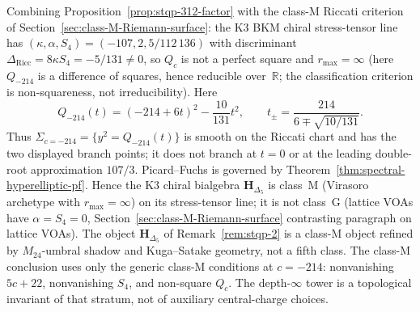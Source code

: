 \begin{remark}[Class-$\mathrm M$ placement of K3 via $c = -214$]
\label{rem:stqp-class-m}
Combining Proposition~\ref{prop:stqp-312-factor} with the
class-$\mathrm M$ Riccati criterion of
Section~\ref{sec:class-M-Riemann-surface}: the K3 BKM chiral
stress-tensor line has
$(\kappa, \alpha, S_4) = (-107, 2, 5/112\,136)$ with discriminant
$\Delta_{\mathrm{Ricc}} = 8\kappa S_4 = -5/131 \neq 0$, so $Q_c$
is not a perfect square and $r_{\max} = \infty$ (here $Q_{-214}$
is a difference of squares, hence reducible over~$\mathbb R$; the
classification criterion is non-squareness, not irreducibility). Here
\[
Q_{-214}(t)=(-214+6t)^2-\frac{10}{131}t^2,
\qquad
t_\pm=\frac{214}{6\mp\sqrt{10/131}}.
\]
Thus $\Sigma_{c = -214}=\{y^2=Q_{-214}(t)\}$ is smooth on the
Riccati chart and has the two displayed branch points; it does not
branch at $t=0$ or at the leading double-root approximation
$107/3$. Picard--Fuchs is governed by
Theorem~\ref{thm:spectral-hyperelliptic-pf}. Hence the K3 chiral
bialgebra $\mathbf H_{\Delta_5}$ is class~$\mathrm M$
(Virasoro archetype with $r_{\max} = \infty$) on its stress-tensor
line; it is not class~$\mathrm G$ (lattice VOAs have
$\alpha = S_4 = 0$, Section~\ref{sec:class-M-Riemann-surface}
contrasting paragraph on lattice VOAs). The object
$\mathbf H_{\Delta_5}$ of Remark~\ref{rem:stqp-2} is a
class-$\mathrm M$ object refined by $M_{24}$-umbral shadow and
Kuga--Satake geometry, not a fifth class. The class-$\mathrm M$
conclusion uses only the generic class-$\mathrm M$ conditions at
$c=-214$: nonvanishing $5c + 22$, nonvanishing $S_4$, and
non-square $Q_c$. The depth-$\infty$ tower is a topological
invariant of that stratum, not of auxiliary central-charge
choices.
\end{remark}

